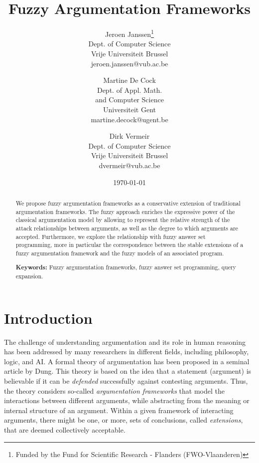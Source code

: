 \documentclass[12pt,a4paper]{article}
\begin{document}
\title{Fuzzy Argumentation Frameworks}
\date{\today}
\author{
Jeroen Janssen\thanks{Funded by the Fund for Scientific Research - Flanders (FWO-Vlaanderen)}\\
  Dept. of Computer Science \\
  Vrije Universiteit Brussel\\
  jeroen.janssen@vub.ac.be \\
\and Martine De Cock \\
  Dept. of Appl. Math. \\
  and Computer Science\\
  Universiteit Gent \\
  martine.decock@ugent.be
\and Dirk Vermeir \\
   Dept. of Computer Science \\
   Vrije Universiteit Brussel\\
   dvermeir@vub.ac.be \\
}

\maketitle
 

\begin{abstract}
We propose fuzzy argumentation frameworks as a conservative extension
of traditional argumentation frameworks\cite{dung95}. The fuzzy
approach enriches the expressive power of the classical argumentation
model by allowing to represent the relative strength of the attack
relationships between arguments, as well as the degree to which
arguments are accepted. Furthermore, we explore the relationship with
fuzzy answer set programming, more in particular the correspondence
between the stable extensions of a fuzzy argumentation framework and
the fuzzy models of an associated program.

{\bf Keywords:} Fuzzy argumentation frameworks, fuzzy answer set programming, query expansion.
\end{abstract}

%
%

\section{Introduction}\label{sec-intro}
The challenge of understanding argumentation and its role in human
reasoning has been addressed by many researchers in different fields,
including philosophy, logic, and AI.  A formal theory of argumentation
has been proposed in a seminal article by Dung\cite{dung95}. This
theory is based on the idea that a statement (argument) is believable
if it can be \emph{defended} successfully against contesting arguments.
Thus, the theory considers so-called \emph{argumentation frameworks} that
model the interactions between different arguments, while abstracting
from the meaning or internal structure of an argument.  Within a given
framework of interacting arguments, there might be one, or more, sets
of conclusions, called \emph{extensions}, that are deemed collectively
acceptable. 
\end{document}
